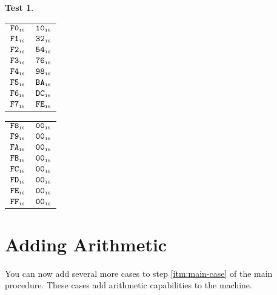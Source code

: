 \documentclass[a4paper,12pt]{article}
\makeatletter
\newcommand{\num}[1]{\texttt{#1}}
\newcommand{\hex}[1]{\num{#1}_{\textup{\tiny 16}}}
\newcommand{\MEM}[1]{\ifthenelse{\equal{#1}{}}{M}{M[#1]}}
\theoremstyle{definition}
\newtheorem{test}{Test}
\newenvironment{memtable}{%
  \begin{trivlist}
    \item
    }{%
    \end{trivlist}}
\newenvironment{memcolumn}{%
  \begin{tabular}{@{}ll@{}}
    \hline}
    {%
    \hline
  \end{tabular}}
\newcommand{\memspace}{\qquad}
\makeatother
\begin{document}
\begin{test}
\begin{memtable}
\begin{memcolumn}
      $\hex{F0}$ & $\hex{10}$ \\
      $\hex{F1}$ & $\hex{32}$ \\
      $\hex{F2}$ & $\hex{54}$ \\
      $\hex{F3}$ & $\hex{76}$ \\
      $\hex{F4}$ & $\hex{98}$ \\
      $\hex{F5}$ & $\hex{BA}$ \\
      $\hex{F6}$ & $\hex{DC}$ \\
      $\hex{F7}$ & $\hex{FE}$ \\
    \end{memcolumn}
    \memspace
    \begin{memcolumn}
      $\hex{F8}$ & $\hex{00}$ \\
      $\hex{F9}$ & $\hex{00}$ \\
      $\hex{FA}$ & $\hex{00}$ \\
      $\hex{FB}$ & $\hex{00}$ \\
      $\hex{FC}$ & $\hex{00}$ \\
      $\hex{FD}$ & $\hex{00}$ \\
      $\hex{FE}$ & $\hex{00}$ \\
      $\hex{FF}$ & $\hex{00}$ \\
    \end{memcolumn}
  \end{memtable}
\end{test}

\section{Adding Arithmetic}

You can now add several more cases to step \ref{itm:main-case} of the main procedure.
These cases add arithmetic capabilities to the machine.
\end{document}
